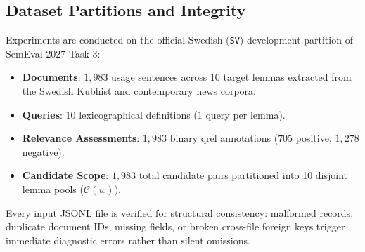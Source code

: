 \subsection{Dataset Partitions and Integrity}
Experiments are conducted on the official Swedish (\texttt{SV}) development partition of SemEval-2027 Task 3:
\begin{itemize}
    \item \textbf{Documents}: $1,983$ usage sentences across 10 target lemmas extracted from the Swedish Kubhist and contemporary news corpora.
    \item \textbf{Queries}: 10 lexicographical definitions ($1$ query per lemma).
    \item \textbf{Relevance Assessments}: $1,983$ binary qrel annotations ($705$ positive, $1,278$ negative).
    \item \textbf{Candidate Scope}: $1,983$ total candidate pairs partitioned into 10 disjoint lemma pools ($\mathcal{C}(w)$).
\end{itemize}
Every input JSONL file is verified for structural consistency: malformed records, duplicate document IDs, missing fields, or broken cross-file foreign keys trigger immediate diagnostic errors rather than silent omissions.

